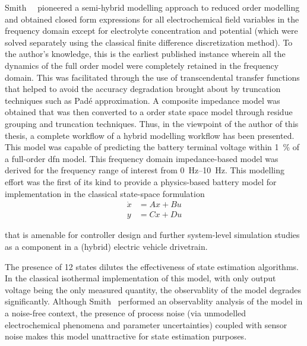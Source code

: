 Smith~\etal{}~\cite{Smith2007}  pioneered   a  semi-hybrid   modelling  approach
to  reduced  order  modelling  and  obtained closed  form  expressions  for  all
electrochemical field variables  in the frequency domain  except for electrolyte
concentration and  potential (which were  solved separately using  the classical
finite difference discretization method). To the author's knowledge, this is the
earliest  published  instance  wherein  all  the  dynamics  of  the  full  order
model were  completely retained  in the frequency  domain. This  was facilitated
through the  use of transcendental transfer  functions that helped to  avoid the
accuracy  degradation  brought about  by  truncation  techniques such  as  Padé
approximation. A composite impedance model  was obtained that was then converted
to  a   order state  space model  through residue  grouping and
truncation techniques.  Thus, in the viewpoint  of the author of  this thesis, a
complete workflow of a hybrid modelling  workflow has been presented. This model
was capable of  predicting the battery terminal  voltage within \SI{1}{\percent}
of a full-order \gls{dfn} model. This frequency domain impedance-based model was
derived for the  frequency range of interest  from \SIrange{0}{10}{\hertz}. This
modelling effort  was the first of  its kind to provide  a physics-based battery
model for implementation in the classical state-space formulation
\begin{equation}
    \begin{aligned}
        \dot{x} &= Ax + Bu \\
        y &= Cx + Du
    \end{aligned}
\end{equation}

that  is amenable  for  controller design  and  further system-level  simulation
studies \eg{} as a component in a (hybrid) electric vehicle drivetrain.


The  presence  of  12  states  dilutes the  effectiveness  of  state  estimation
algorithms. In the classical isothermal  implementation of this model, with only
output  voltage  being the  only  measured  quantity,  the observablity  of  the
model degrades  significantly. Although Smith~\etal{} performed  an observablity
analysis of  the model in  a noise-free context,  the presence of  process noise
(via unmodelled  electrochemical phenomena and parameter  uncertainties) coupled
with sensor noise makes this model unattractive for state estimation purposes.

